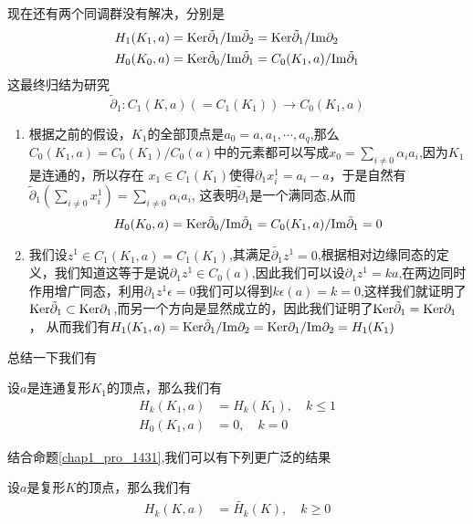 现在还有两个同调群没有解决，分别是
\begin{equation*}
    \begin{aligned}
    H_{1}(K_{1},a)&={\rm Ker} \tilde{\partial}_{1}/{\rm Im}\tilde{\partial}_{2}={\rm Ker} \tilde{\partial}_{1}/{\rm Im}\partial_{2}\\
    H_{0}(K_{0},a)&={\rm Ker} \tilde{\partial}_{0}/{\rm Im}\tilde{\partial}_{1}=C_{0}(K_{1},a)/{\rm Im}\tilde{\partial}_{1}\\
    \end{aligned}
\end{equation*}
这最终归结为研究
$$\tilde{\partial}_{1}:C_{1}(K,a)(=C_{1}(K_{1}))\rightarrow C_{0}(K_{1},a)$$
\begin{enumerate}
    \item 根据之前的假设，$K_{1}$的全部顶点是$a_{0}=a,a_{1},\cdots,a_{q}$,那么$C_{0}(K_{1},a)=C_{0}(K_{1})/C_{0}(a)$中的元素都可以写成$x_{0}=\sum_{i\neq 0}\alpha_{i}a_{i}$,因为$K_{1}$是连通的，所以存在
    $x_{1}\in C_{1}(K_{1})$使得$\partial_{1}x_{i}^{1}=a_{i}-a$，于是自然有$\tilde{\partial}_{1}(\sum_{i\neq 0}x_{i}^{1})=\sum_{i\neq 0}\alpha_{i}a_{i}$,
    这表明$\tilde{\partial}_{1}$是一个满同态,从而$$H_{0}(K_{0},a)={\rm Ker} \tilde{\partial}_{0}/{\rm Im}\tilde{\partial}_{1}=C_{0}(K_{1},a)/{\rm Im}\tilde{\partial}_{1}=0$$
    \item 我们设$z^{1}\in C_{1}(K_{1},a)=C_{1}(K_{1})$,其满足$\tilde{\partial_{1}}z^{1}=0$,根据相对边缘同态的定义，我们知道这等于是说$\partial_{1}z^{1}\in C_{0}(a)$,因此我们可以设$\partial_{1}z^{1}=ka$,在两边同时作用增广同态，利用$\partial_{1}z^{1}\epsilon=0$我们可以得到$k\epsilon(a)=k=0$,这样我们就证明了${\rm Ker} \tilde{\partial}_{1}\subset {\rm Ker}\partial_{1}$,而另一个方向是显然成立的，因此我们证明了${\rm Ker} \tilde{\partial}_{1}={\rm Ker}\partial_{1}$，
    从而我们有$H_{1}(K_{1},a)={\rm Ker}\tilde{\partial}_{1}/{\rm Im} \partial_{2}={\rm Ker}{\partial_{1}}/{\rm Im} \partial_{2}=H_{1}(K_{1})$
\end{enumerate}
总结一下我们有
\begin{proposition}
设$a$是连通复形$K_{1}$的顶点，那么我们有
\begin{equation}
    \begin{aligned}
    H_{k}(K_{1},a)&=H_{k}(K_{1}),\quad k\leq 1\\
    H_{0}(K_{1},a)&=0,\quad k=0
    \end{aligned}
\end{equation}
\end{proposition}
结合命题\eqref{chap1_pro_1431},我们可以有下列更广泛的结果
\begin{proposition}\label{chap3_79}
设$a$是复形$K$的顶点，那么我们有
\begin{equation}
    \begin{aligned}
    H_{k}(K,a)&=\tilde{H_{k}}(K),\quad k\geq 0\\
    \end{aligned}
\end{equation}
\end{proposition}
